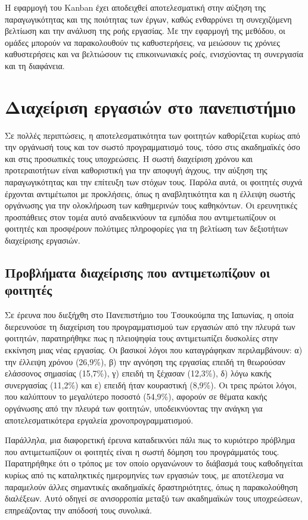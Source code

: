             Η εφαρμογή του Kanban έχει αποδειχθεί αποτελεσματική στην αύξηση της παραγωγικότητας και της ποιότητας των έργων, καθώς ενθαρρύνει τη συνεχιζόμενη βελτίωση και την ανάλυση της ροής εργασίας. Με την εφαρμογή της μεθόδου, οι ομάδες μπορούν να παρακολουθούν τις καθυστερήσεις, να μειώσουν τις χρόνιες καθυστερήσεις και να βελτιώσουν τις επικοινωνιακές ροές, ενισχύοντας τη συνεργασία και τη διαφάνεια. \cite{AndersonKanban} \cite{Agile_Stellman}


    \section{Διαχείριση εργασιών στο πανεπιστήμιο}
        Σε πολλές περιπτώσεις, η αποτελεσματικότητα των φοιτητών καθορίζεται κυρίως από την οργάνωσή τους και τον σωστό προγραμματισμό τους, τόσο στις ακαδημαϊκές όσο και στις προσωπικές τους υποχρεώσεις. Η σωστή διαχείριση χρόνου και προτεραιοτήτων είναι καθοριστική για την αποφυγή άγχους, την αύξηση της παραγωγικότητας και την επίτευξη των στόχων τους. Παρόλα αυτά, οι φοιτητές συχνά έρχονται αντιμέτωποι με προκλήσεις, όπως η αναβλητικότητα και η έλλειψη σωστής οργάνωσης για την ολοκλήρωση των καθημερινών τους καθηκόντων. Οι ερευνητικές προσπάθειες στον τομέα αυτό αναδεικνύουν τα εμπόδια που αντιμετωπίζουν οι φοιτητές και προσφέρουν πολύτιμες πληροφορίες για τη βελτίωση των δεξιοτήτων διαχείρισης εργασιών.

        \subsection{Προβλήματα διαχείρισης που αντιμετωπίζουν οι φοιτητές}
            Σε έρευνα \cite{Fukuzawa2015} που διεξήχθη στο Πανεπιστήμιο του Τσουκούμπα της Ιαπωνίας, η οποία διερευνούσε τη διαχείριση του προγραμματισμού των εργασιών από την πλευρά των φοιτητών, παρατηρήθηκε πως η πλειοψηφία τους αντιμετωπίζει δυσκολίες στην εκκίνηση μιας νέας εργασίας. Οι βασικοί λόγοι που καταγράφηκαν περιλαμβάνουν: α) την έλλειψη χρόνου (26,9\%), β) την αγνόηση της εργασίας επειδή τη θεωρούσαν ελάσσονος σημασίας (15,7\%), γ) επειδή τη ξέχασαν (12,3\%), δ) λόγω κακής συνεργασίας (11,2\%) και ε) επειδή ήταν κουραστική (8,9\%). Οι τρεις πρώτοι λόγοι, που καλύπτουν το μεγαλύτερο ποσοστό (54,9\%), αφορούν σε θέματα κακής οργάνωσης από την πλευρά των φοιτητών, υποδεικνύοντας την ανάγκη για αποτελεσματικότερα εργαλεία χρονοπρογραμματισμού.

            Παράλληλα, μια διαφορετική έρευνα \cite{Trujillo2020} καταδεικνύει πάλι πως το κυριότερο πρόβλημα που αντιμετωπίζουν οι φοιτητές είναι η σωστή δόμηση του προγράμματός τους. Παρατηρήθηκε ότι ο τρόπος με τον οποίο οργανώνουν το διάβασμά τους καθοδηγείται κυρίως από τις καταληκτικές ημερομηνίες των εργασιών τους, με αποτέλεσμα να παραμελούν άλλες σημαντικές ακαδημαϊκές δραστηριότητες, όπως η παρακολούθηση διαλέξεων. Αυτό οδηγεί σε ανισορροπία μεταξύ των ακαδημαϊκών τους υποχρεώσεων, επηρεάζοντας την απόδοσή τους συνολικά.

